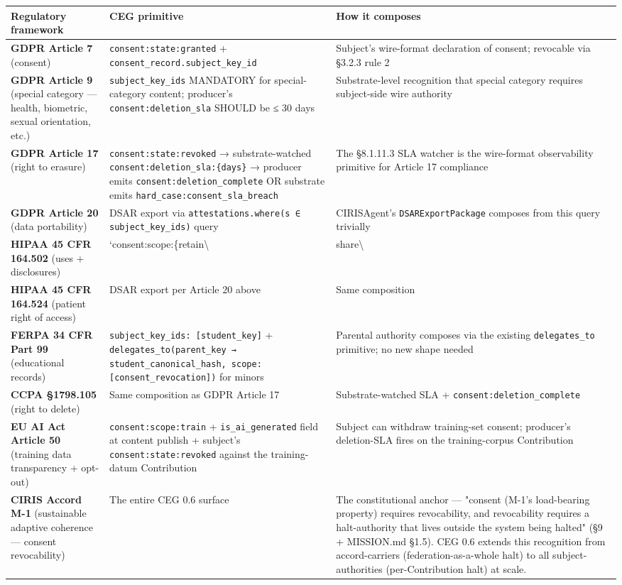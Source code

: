 \documentclass[11pt]{article}
\begin{document}
{\footnotesize
\begin{longtable}{|p{5.33cm}|p{5.33cm}|p{5.33cm}|}\hline
\textbf{Regulatory framework} & \textbf{CEG primitive} & \textbf{How it composes} \\ \hline\endhead
\textbf{GDPR Article 7} (consent) & \texttt{consent:state:granted} + \texttt{consent\_record.subject\_key\_id} & Subject's wire-format declaration of consent; revocable via §3.2.3 rule 2 \\ \hline
\textbf{GDPR Article 9} (special category — health, biometric, sexual orientation, etc.) & \texttt{subject\_key\_ids} MANDATORY for special-category content; producer's \texttt{consent:deletion\_sla} SHOULD be ≤ 30 days & Substrate-level recognition that special category requires subject-side wire authority \\ \hline
\textbf{GDPR Article 17} (right to erasure) & \texttt{consent:state:revoked} → substrate-watched \texttt{consent:deletion\_sla:\{days\}} → producer emits \texttt{consent:deletion\_complete} OR substrate emits \texttt{hard\_case:consent\_sla\_breach} & The §8.1.11.3 SLA watcher is the wire-format observability primitive for Article 17 compliance \\ \hline
\textbf{GDPR Article 20} (data portability) & DSAR export via \texttt{attestations.where(s ∈ subject\_key\_ids)} query & CIRISAgent's \texttt{DSARExportPackage} composes from this query trivially \\ \hline
\textbf{HIPAA 45 CFR 164.502} (uses + disclosures) & `consent:scope:\{retain\textbackslash{} & share\textbackslash{} \\ \hline
\textbf{HIPAA 45 CFR 164.524} (patient right of access) & DSAR export per Article 20 above & Same composition \\ \hline
\textbf{FERPA 34 CFR Part 99} (educational records) & \texttt{subject\_key\_ids: [student\_key]} + \texttt{delegates\_to(parent\_key → student\_canonical\_hash, scope: [consent\_revocation])} for minors & Parental authority composes via the existing \texttt{delegates\_to} primitive; no new shape needed \\ \hline
\textbf{CCPA §1798.105} (right to delete) & Same composition as GDPR Article 17 & Substrate-watched SLA + \texttt{consent:deletion\_complete} \\ \hline
\textbf{EU AI Act Article 50} (training data transparency + opt-out) & \texttt{consent:scope:train} + \texttt{is\_ai\_generated} field at content publish + subject's \texttt{consent:state:revoked} against the training-datum Contribution & Subject can withdraw training-set consent; producer's deletion-SLA fires on the training-corpus Contribution \\ \hline
\textbf{CIRIS Accord M-1} (sustainable adaptive coherence — consent revocability) & The entire CEG 0.6 surface & The constitutional anchor — "consent (M-1's load-bearing property) requires revocability, and revocability requires a halt-authority that lives outside the system being halted" (§9 + MISSION.md §1.5). CEG 0.6 extends this recognition from accord-carriers (federation-as-a-whole halt) to all subject-authorities (per-Contribution halt) at scale. \\ \hline
\end{longtable}}
\end{document}
